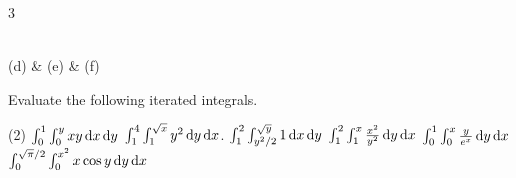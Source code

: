 \begin{solution}
\begin{center}
\begin{figuretable}{3}
\\
(d) & (e) & (f)
\end{figuretable}
\end{center}
\end{solution}

\begin{question}
Evaluate the following iterated integrals.
\begin{tasks}(2)
\task
$\int_0^1 \int_0^y xy \,\mathrm{d} x \,\mathrm{d} y$
\task
$\int_1^4 \int_1^{\sqrt{x}} y^2 \,\mathrm{d} y \,\mathrm{d} x$.
\task
$\int_1^2 \int_{y^2/2}^{\sqrt y} 1 \,\mathrm{d} x \,\mathrm{d} y$
\task
$\int_1^2 \int_1^x \frac{x^2}{y^2} \,\mathrm{d} y \,\mathrm{d} x$
\task
$\int_0^1 \int_0^x \frac{y}{e^x} \,\mathrm{d} y \,\mathrm{d} x$
\task
$\int_0^{\sqrt{\pi}/2} \int_0^{x^2} x \cos y \,\mathrm{d} y \,\mathrm{d} x$
\end{tasks}
\end{question}

